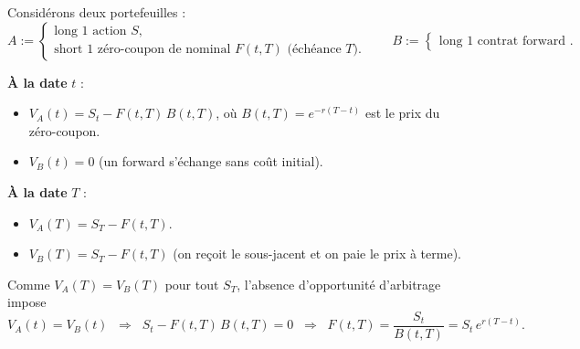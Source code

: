 



Considérons deux portefeuilles :
\[
A := 
\begin{cases}
\text{long } 1 \text{ action } S,\\
\text{short } 1 \text{ zéro-coupon de nominal } F(t,T) \text{ (échéance } T).
\end{cases}
\qquad
B := 
\begin{cases}
\text{long } 1 \text{ contrat forward }.
\end{cases}
\]

\textbf{À la date } $t$ :
\begin{itemize}
  \item $V_A(t) = S_t - F(t,T)\,B(t,T)$, \quad où $B(t,T)=e^{-r(T-t)}$ est le prix du zéro-coupon.
  \item $V_B(t) = 0$ \; (un forward s’échange sans coût initial).
\end{itemize}

\textbf{À la date } $T$ :
\begin{itemize}
  \item $V_A(T) = S_T - F(t,T)$.
  \item $V_B(T) = S_T - F(t,T)$ \; (on reçoit le sous-jacent et on paie le prix à terme).
\end{itemize}

\vspace{0.5cm}


Comme $V_A(T)=V_B(T)$ pour tout $S_T$, l’absence d’opportunité d’arbitrage impose
\[
V_A(t)=V_B(t)
\;\;\Longrightarrow\;\;
S_t - F(t,T)\,B(t,T) = 0
\;\;\Longrightarrow\;\;
F(t,T) = \frac{S_t}{B(t,T)} = S_t\,e^{r(T-t)}.
\]



